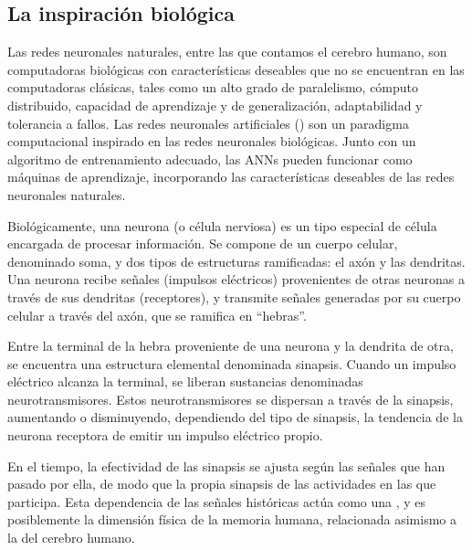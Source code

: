 %
%
\subsection{La inspiración biológica}
%
Las redes neuronales naturales, entre las que contamos el cerebro
humano, son computadoras biológicas con características deseables que
no se encuentran en las computadoras clásicas, tales como un alto
grado de paralelismo, cómputo distribuido, capacidad de aprendizaje y
de generalización, adaptabilidad y tolerancia a fallos.  Las redes
neuronales artificiales () son
un paradigma computacional inspirado en las redes neuronales
biológicas. Junto con un algoritmo de entrenamiento adecuado, las
ANNs pueden funcionar como máquinas de aprendizaje, incorporando
las características deseables de las redes neuronales naturales.

Biológicamente, una neurona (o célula nerviosa) es un tipo especial de
célula encargada de procesar información.  Se compone de un cuerpo
celular, denominado {soma}, y dos tipos de estructuras ramificadas:
el axón y las dendritas. Una neurona recibe señales (impulsos
eléctricos) provenientes de otras neuronas a través de sus dendritas
(receptores), y transmite señales generadas por su cuerpo celular a
través del axón, que se ramifica en ``hebras''.

Entre la terminal de la hebra proveniente de una neurona y la
dendrita de otra, se encuentra una estructura elemental denominada
sinapsis.  Cuando un impulso eléctrico alcanza la terminal,
se liberan sustancias denominadas neurotransmisores. Estos
neurotransmisores se dispersan a través de la sinapsis, aumentando o
disminuyendo, dependiendo del tipo de sinapsis, la tendencia de la
neurona receptora de emitir un impulso eléctrico propio.

En el tiempo, la efectividad de las sinapsis se ajusta según las
señales que han pasado por ella, de modo que la propia sinapsis
 de las actividades en las que participa. Esta dependencia
de las señales históricas actúa como una , y es
posiblemente la dimensión física de la memoria humana, relacionada
asimismo a la  del cerebro humano.
